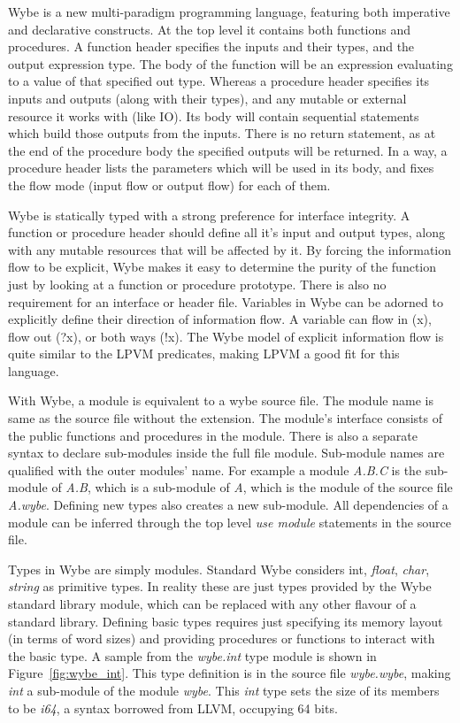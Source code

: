 Wybe is a new multi-paradigm programming language, featuring both imperative
and declarative constructs. At the top level it contains both functions and
procedures. A function header specifies the inputs and their types, and the
output expression type. The body of the function will be an expression
evaluating to a value of that specified out type. Whereas a procedure header
specifies its inputs and outputs (along with their types), and any mutable or
external resource it works with (like IO). Its body will contain sequential
statements which build those outputs from the inputs. There is no return
statement, as at the end of the procedure body the specified outputs will be
returned. In a way, a procedure header lists the parameters which will be used
in its body, and fixes the flow mode (input flow or output flow) for each of
them.

Wybe is statically typed with a strong preference for interface integrity. A
function or procedure header should define all it's input and output types,
along with any mutable resources that will be affected by it. By forcing the
information flow to be explicit, Wybe makes it easy to determine the purity of
the function just by looking at a function or procedure prototype. There is
also no requirement for an interface or header file. Variables in Wybe can be
adorned to explicitly define their direction of information flow. A variable
can flow in (x), flow out (?x), or both ways (!x). The Wybe model of explicit
information flow is quite similar to the LPVM predicates, making LPVM a good
fit for this language.

With Wybe, a module is equivalent to a wybe source file. The module name is
same as the source file without the extension. The module's interface consists
of the public functions and procedures in the module. There is also a separate
syntax to declare sub-modules inside the full file module. Sub-module names are
qualified with the outer modules' name. For example a module \textit{A.B.C} is
the sub-module of \textit{A.B}, which is a sub-module of \textit{A}, which is
the module of the source file \textit{A.wybe}. Defining new types also creates
a new sub-module. All dependencies of a module can be inferred through the top
level \textit{use module} statements in the source file.

Types in Wybe are simply modules. Standard Wybe considers {int},
\textit{float}, \textit{char}, \textit{string} as primitive types. In reality
these are just types provided by the Wybe standard library module, which can be
replaced with any other flavour of a standard library. Defining basic types
requires just specifying its memory layout (in terms of word sizes) and
providing procedures or functions to interact with the basic type. A sample
from the \textit{wybe.int} type module is shown in Figure~\ref{fig:wybe_int}. This
type definition is in the source file \textit{wybe.wybe}, making \textit{int} a sub-module
of the module \textit{wybe}. This \textit{int} type sets the size of its
members to be \textit{i64}, a syntax borrowed from LLVM, occupying 64 bits. 

